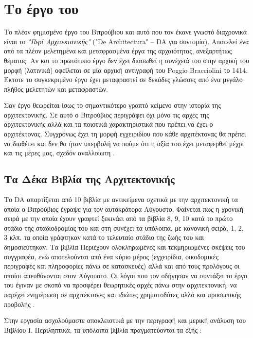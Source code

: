 \section{Το έργο του} 

Το πλέον φημισμένο έργο του Βιτρούβιου και αυτό που τον έκανε γνωστό διαχρονικά είναι το \emph{"Περί Αρχιτεκτονικής"} ("De Architectura" -- DA για συντομία). Aποτελεί ένα από τα πλέον μελετημένα και μεταφρασμένα έργα της αρχαιότητας, ανεξαρτήτως θέματος. Αν και το πρωτότυπο έργο δεν έχει διασωθεί η συνέχειά του στην αρχική του μορφή (λατινικά) οφείλεται σε μία αρχική αντιγραφή του Poggio Bracciolini το 1414. Έκτοτε το συγκεκριμένο έργο έχει μεταφραστεί σε δεκάδες γλώσσες από ένα μεγάλο πλήθος μελετητών και μεταφραστών.

Σαν έργο θεωρείται ίσως το σημαντικότερο γραπτό κείμενο στην ιστορία της αρχιτεκτονικής. Σε αυτό ο Βιτρούβιος περιγράφει όχι μόνο τις αρχές της αρχιτεκτονικής αλλά και τα ποιοτικά χαρακτηριστικά που πρέπει να έχει ο αρχιτέκτονας. Συγχρόνως έχει τη μορφή εγχειριδίου που κάθε αρχιτέκτονας θα πρέπει να διαθέτει και δεν θα ήταν υπερβολή να πούμε ότι η αξία του έχει μεταφερθεί μέχρι και τις μέρες μας, σχεδόν αναλλοίωτη \cite[σ. 16-18]{vitruvius-lefas}.

\subsection{Τα Δέκα Βιβλία της Αρχιτεκτονικής}

Το DA απαρτίζεται από 10 βιβλία με αντικείμενα σχετικά με την αρχιτεκτονική τα οποία ο Βιτρούβιος έγραψε για τον αυτοκράτορα Αύγουστο. Φαίνεται πως η χρονική σειρά με την οποία έχουν γραφτεί ξεκινάει από τα βιβλία 8, 9, 10 κατά το πρώτο στάδιο της σταδιοδρομίας του και στη συνέχει τα υπόλοιπα, με κανονική σειρά, 1, 2, 3 κλπ. τα οποία γράφτηκαν κατά το τελευταίο στάδιο της ζωής του και δημοσιεύτηκαν. Τα βιβλία Περιέχουν ολοκληρωμένες και τεκμηριωμένες σκέψεις του συγγραφέα, ενώ αποτελούνται από ένα κύριο μέρος (εγχειρίδια, οικοδομικές περιγραφές και πληροφορίες πάνω σε κατασκευές) αλλά και από τους προλόγους οι οποίοι απευθύνονται στον Αύγουστο. Οι λόγοι που τον οδήγησαν να συντάξει το έργο του έγιναν με σκοπό να προσφέρει θεωρητικές αρχές πάνω στην αρχιτεκτονική, να παρέχει ενημέρωση σε αρχιτέκτονες και ιδιώτες χρηματοδότες αλλά και προσωπικής προβολής \cite{vitruvius-lefas}.

Στην εργασία ασχολούμαστε αποκλειστικά με την περιγραφή και μερική ανάλυση του Bιβλίου I. Περιληπτικά, τα υπόλοιπα βιβλία πραγματεύονται τα εξής \cite{erismis_critical_2013}:

